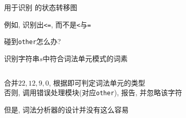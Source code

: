 \begin{frame}{}
  \begin{center}
    用于识别 \blue{\relop} 的状态转移图

    \pause
    \vspace{0.30cm}
     例如, 识别出\texttt{<=}, 而不是\texttt{<}与\texttt{=}

    \pause
    \vspace{0.30cm}
     碰到\texttt{other}怎么办?
  \end{center}
\end{frame}

\begin{frame}{}
  \begin{center}
    识别字符串$s$中符合词法单元模式的词素
  \end{center}

  \begin{columns}
      \begin{center}
      \end{center}
      \begin{center}
      \end{center}
  \end{columns}

  \pause
  \vspace{0.30cm}
  \begin{center}
     合并$22, 12, 9, 0$, 根据即可判定词法单元的类型 \\[8pt]
    否则, 调用错误处理模块(对应\texttt{other}), 报告, 并忽略该字符
  \end{center}
\end{frame}

\begin{frame}{}
  \begin{center}
    但是, 词法分析器的设计并没有这么容易

    \vspace{0.50cm}
  \end{center}
\end{frame}

